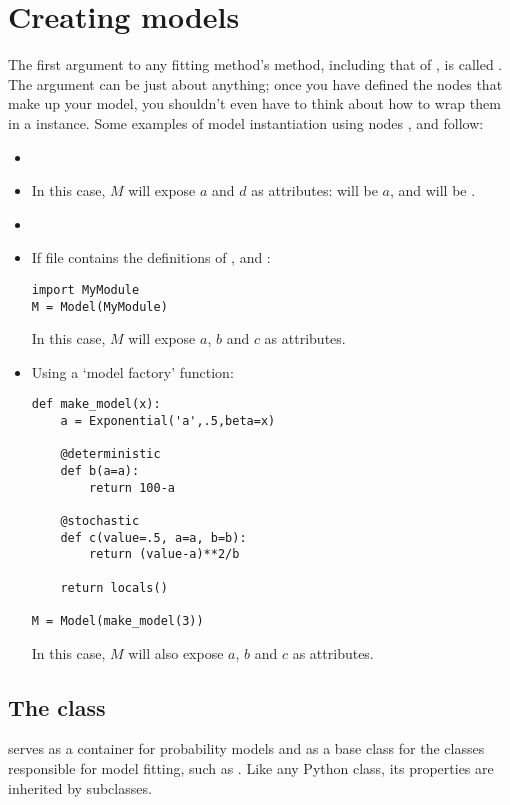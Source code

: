 \section{Creating models} \label{sec:ModelInstantiation}
The first argument to any fitting method's  method, including that of , is called . The  argument can be just about anything; once you have defined the nodes that make up your model, you shouldn't even have to think about how to wrap them in a  instance. Some examples of model instantiation using nodes ,  and  follow:
\begin{itemize}
    \item {}
    \item {} In this case, $M$ will expose $a$ and $d$ as attributes:  will be $a$, and  will be \code{[b,c]}.
    \item {}
    \item If file  contains the definitions of ,  and :
   \begin{verbatim}
import MyModule
M = Model(MyModule)
    \end{verbatim}
    In this case, $M$ will expose $a$, $b$ and $c$ as attributes.
    \item Using a `model factory' function:
    \begin{verbatim}
def make_model(x):
    a = Exponential('a',.5,beta=x)

    @deterministic
    def b(a=a):
        return 100-a

    @stochastic
    def c(value=.5, a=a, b=b):
        return (value-a)**2/b

    return locals()

M = Model(make_model(3))
    \end{verbatim}
    In this case, $M$ will also expose $a$, $b$ and $c$ as attributes.
\end{itemize}

\hypertarget{model}{}
\subsection[The Model class]{The  class} \label{sec:Model}
 serves as a container for probability models and as a base class for the classes responsible for model fitting, such as . Like any Python class, its properties are inherited by subclasses.

